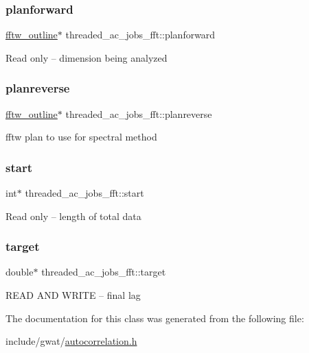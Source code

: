 \subsubsection{\texorpdfstring{planforward}{planforward}}
{\footnotesize\ttfamily \hyperlink{structfftw__outline}{fftw\+\_\+outline}$\ast$ threaded\+\_\+ac\+\_\+jobs\+\_\+fft\+::planforward}

Read only -- dimension being analyzed \mbox{\label{classthreaded__ac__jobs__fft_a9f821f5df06f0dd6b223444759143c0e}} 
\subsubsection{\texorpdfstring{planreverse}{planreverse}}
{\footnotesize\ttfamily \hyperlink{structfftw__outline}{fftw\+\_\+outline}$\ast$ threaded\+\_\+ac\+\_\+jobs\+\_\+fft\+::planreverse}

fftw plan to use for spectral method \mbox{\label{classthreaded__ac__jobs__fft_ab53d18101cba2f6e8894076aec04e033}} 
\subsubsection{\texorpdfstring{start}{start}}
{\footnotesize\ttfamily int$\ast$ threaded\+\_\+ac\+\_\+jobs\+\_\+fft\+::start}

Read only -- length of total data \mbox{\label{classthreaded__ac__jobs__fft_a3a7fa6df5c4af8bce5820c483598fc9e}} 
\subsubsection{\texorpdfstring{target}{target}}
{\footnotesize\ttfamily double$\ast$ threaded\+\_\+ac\+\_\+jobs\+\_\+fft\+::target}

R\+E\+AD A\+ND W\+R\+I\+TE -- final lag 

The documentation for this class was generated from the following file\+:\begin{DoxyCompactItemize}
\item 
include/gwat/\hyperlink{autocorrelation_8h}{autocorrelation.\+h}\end{DoxyCompactItemize}
